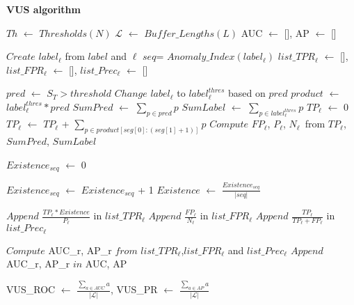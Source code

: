 \begin{algorithm}[tb]
{\small
    \caption{\textbf{VUS algorithm}}\label{alg:VUS}
    \label{alg:vus}
    \BlankLine
    $Th$ $\leftarrow$ $Thresholds(N)$\;
    $\mathcal{L}$ $\leftarrow$ $Buffer\_Lengths(L)$\;
    AUC $\leftarrow$ [],
    AP $\leftarrow$ []\;
    {
        $Create$ $label_\ell$ from $label$ and $\ell$\;
        $seq$= $Anomaly\_Index(label_\ell)$\;
        $list\_TPR_{\ell}$ $\leftarrow$ [],
        $list\_FPR_{\ell}$ $\leftarrow$ [],
        $list\_Prec_{\ell}$ $\leftarrow$ []\;
        {   
            $pred$ $\leftarrow$ $S_{T}>threshold$\;
            $Change$ $label_\ell$ to $label_\ell^{thres}$ based on $pred$\;
            $product$ $\leftarrow$ $label_\ell^{thres}*pred$\;
            $SumPred$ $\leftarrow$ $\sum_{p\in pred} p$\;
            $SumLabel$ $\leftarrow$ $\sum_{p\in label_\ell^{thres}} p$\;
            $TP_\ell$ $\leftarrow$ 0\;
            {
                $TP_\ell$ $\leftarrow$ $TP_\ell$ + $\sum_{p\in product[seg[0]:(seg[1]+1)]}p$
            }
            $Compute$ $FP_\ell$, $P_\ell$, $N_\ell$\ from $TP_\ell$, $SumPred$, $SumLabel$\;%
            
            $Existence_{seq}$ $\leftarrow$ 0\;
            {
                {
                    $Existence_{seq}$ $\leftarrow$ $Existence_{seq}$ + 1
                }
                $Existence$ $\leftarrow$ $\frac{Existence_{seq}}{|seq|}$
                  
            }
            $Append$ $\frac{TP_\ell*Existence}{P_\ell}$ in $list\_TPR_{\ell}$\;
            $Append$ $\frac{FP_\ell}{N_\ell}$ in $list\_FPR_{\ell}$\;
            $Append$ $\frac{TP_\ell}{TP_\ell+FP_\ell}$ in $list\_Prec_{\ell}$\;
        }
        $Compute$ AUC\_r, AP\_r $from$ $list\_TPR_{\ell}$,$list\_FPR_{\ell}$ and $list\_Prec_{\ell}$\;
        $Append$ AUC\_r, AP\_r $in$ AUC, AP\;
    }
    VUS\_ROC $\leftarrow$ $\frac{\sum_{a\in AUC}a}{|\mathcal{L}|}$,
    VUS\_PR $\leftarrow$ $\frac{\sum_{a\in AP}a}{|\mathcal{L}|}$\;
 }
\end{algorithm}

